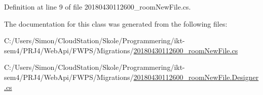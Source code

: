 Definition at line 9 of file 20180430112600\+\_\+room\+New\+File.\+cs.



The documentation for this class was generated from the following files\+:\begin{DoxyCompactItemize}
\item 
C\+:/\+Users/\+Simon/\+Cloud\+Station/\+Skole/\+Programmering/ikt-\/sem4/\+P\+R\+J4/\+Web\+Api/\+F\+W\+P\+S/\+Migrations/\mbox{\hyperlink{20180430112600__room_new_file_8cs}{20180430112600\+\_\+room\+New\+File.\+cs}}\item 
C\+:/\+Users/\+Simon/\+Cloud\+Station/\+Skole/\+Programmering/ikt-\/sem4/\+P\+R\+J4/\+Web\+Api/\+F\+W\+P\+S/\+Migrations/\mbox{\hyperlink{20180430112600__room_new_file_8_designer_8cs}{20180430112600\+\_\+room\+New\+File.\+Designer.\+cs}}\end{DoxyCompactItemize}

